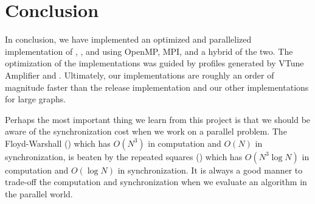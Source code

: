 \section{Conclusion}\label{sec:conclusion}
In conclusion, we have implemented an optimized and parallelized implementation
of \rs{}, \block{}, and \fw{} using OpenMP, MPI, and a hybrid of the two. The
optimization of the implementations was guided by profiles generated by VTune
Amplifier and \icc{}. Ultimately, our \block{} implementations are roughly an
order of magnitude faster than the release implementation and our other
implementations for large graphs.

Perhaps the most important thing we learn from this project is that we should be aware of 
the synchronization cost when we work on a parallel problem. The Floyd-Warshall (\fw{})
which has $O(N^3)$ in computation and $O(N)$ in synchronization, is beaten by the 
repeated squares (\rs) which has $O(N^3\log N)$ in computation and $O(\log N)$ in synchronization. 
It is always a good manner to trade-off the computation and synchronization 
when we evaluate an algorithm in the parallel world. 

